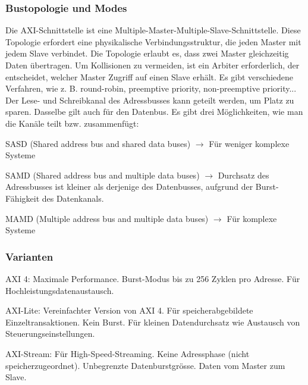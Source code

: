 \subsubsection{Bustopologie und Modes}
Die AXI-Schnittstelle ist eine Multiple-Master-Multiple-Slave-Schnittstelle. Diese Topologie erfordert eine physikalische Verbindungsstruktur, die jeden Master mit jedem Slave verbindet. Die Topologie erlaubt es, dass zwei Master gleichzeitig Daten übertragen. Um Kollisionen zu vermeiden, ist ein Arbiter erforderlich, der entscheidet, welcher Master Zugriff auf einen Slave erhält. Es gibt verschiedene Verfahren, wie z. B. round-robin, preemptive priority, non-preemptive priority...
Der Lese- und Schreibkanal des Adressbusses kann geteilt werden, um Platz zu sparen. Dasselbe gilt auch für den Datenbus. Es gibt drei Möglichkeiten, wie man die Kanäle teilt bzw. zusammenfügt:
\begin{compactitem}
    \item SASD (Shared address bus and shared data buses) $\rightarrow$ Für weniger komplexe Systeme
    \item SAMD (Shared address bus and multiple data buses) $\rightarrow$ Durchsatz des Adressbusses ist kleiner als derjenige des Datenbusses, aufgrund der Burst-Fähigkeit des Datenkanals.
    \item MAMD (Multiple address bus and multiple data buses) $\rightarrow$ Für komplexe Systeme
\end{compactitem}
\subsubsection{Varianten}
\begin{compactitem}
    \item AXI 4: Maximale Performance. Burst-Modus bis zu 256 Zyklen pro Adresse. Für Hochleistungsdatenaustausch.
    \item AXI-Lite: Vereinfachter Version von AXI 4. Für speicherabgebildete Einzeltransaktionen. Kein Burst. Für kleinen Datendurchsatz wie Austausch von Steuerungseinstellungen.
    \item AXI-Stream: Für High-Speed-Streaming. Keine Adressphase (nicht speicherzugeordnet). Unbegrenzte Datenburstgrösse. Daten vom Master zum Slave.
\end{compactitem}

